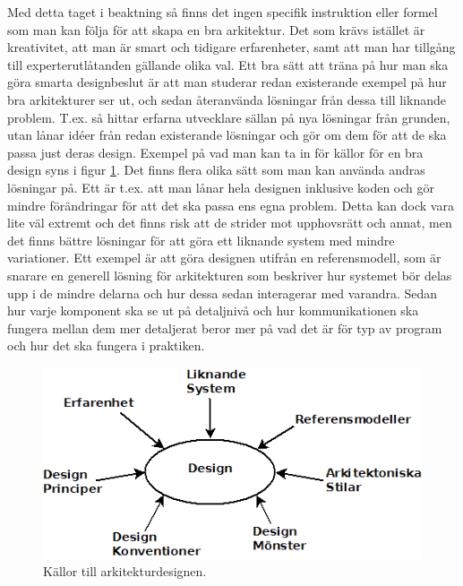 Med detta taget i beaktning så finns det ingen specifik instruktion eller formel som man kan följa för att skapa en bra arkitektur. Det som krävs istället är kreativitet, att man är smart och tidigare erfarenheter, samt att man har tillgång till experterutlåtanden gällande olika val.
\newline
\newline
Ett bra sätt att träna på hur man ska göra smarta designbeslut är att man studerar redan existerande exempel på hur bra arkitekturer ser ut, och sedan återanvända lösningar från dessa till liknande problem. T.ex. så hittar erfarna utvecklare sällan på nya lösningar från grunden, utan lånar idéer från redan existerande lösningar och gör om dem för att de ska passa just deras design. Exempel på vad man kan ta in för källor för en bra design syns i figur \ref{fig:des}.
\newline
\newline
Det finns flera olika sätt som man kan använda andras lösningar på. Ett är t.ex. att man lånar hela designen inklusive koden och gör mindre förändringar för att det ska passa ens egna problem. Detta kan dock vara lite väl extremt och det finns risk att de strider mot upphovsrätt och annat, men det finns bättre lösningar för att göra ett liknande system med mindre variationer. Ett exempel är att göra designen utifrån en referensmodell, som är snarare en generell lösning för arkitekturen som beskriver hur systemet bör delas upp i de mindre delarna och hur dessa sedan interagerar med varandra. Sedan hur varje komponent ska se ut på detaljnivå och hur kommunikationen ska fungera mellan dem mer detaljerat beror mer på vad det är för typ av program och hur det ska fungera i praktiken. \cite[s. 226--227]{set}

\begin{figure}[h]
\centerline{\includegraphics[scale=0.6]{sebastian-tex/grafik/designadvice.png}}
\caption{Källor till arkitekturdesignen.}
\label{fig:des}
\end{figure}

